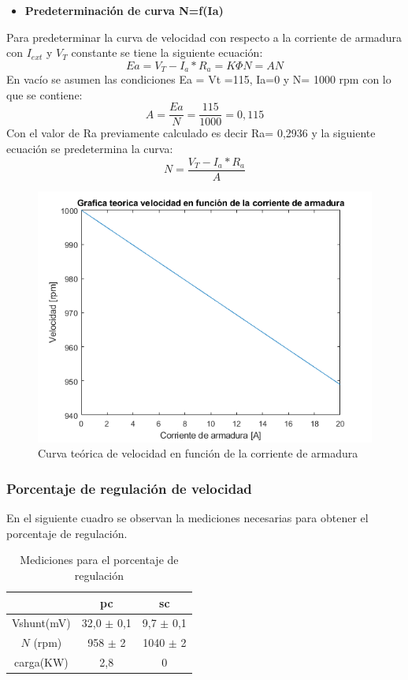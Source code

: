 \documentclass[11pt,letterpaper]{article}     %
\begin{document}
	\begin{itemize}
		\item \textbf{Predeterminación de curva N=f(Ia)}
	\end{itemize}
	Para predeterminar la curva de velocidad con respecto a la corriente de armadura con $I_{ext}$ y $V_{T}$ constante se tiene la siguiente ecuación:
	\begin{equation}
		Ea= V_T - I_a * R_a = K \Phi N = AN
	\end{equation}
	En vacío se asumen las condiciones Ea = Vt =115, Ia=0 y N= 1000 rpm con lo que se contiene:
	\begin{equation}
		A=\frac{Ea}{N}= \frac{115}{1000}=0,115
		\label{ecuacion A}
	\end{equation}
	Con el valor de Ra previamente calculado es decir Ra= 0,2936 y la siguiente ecuación se predetermina la curva:
	\begin{equation}
	N =\frac{V_T - I_a * R_a}{A}
		\label{ec.Velocidad corriente}
	\end{equation}
		\begin{figure}[H]
		\centering
		\includegraphics[scale=0.8]{./recursos-Lab6/curvaPredeterminarVelocidadCorrienteArmadura.png}
		\caption{Curva teórica de velocidad en función de la corriente de armadura}
		\label{fig:CurvaPredeterminarVelocidadCorrienteArmadura}
	\end{figure}
\subsubsection{Porcentaje de regulación de velocidad}
En el siguiente cuadro se observan la mediciones necesarias para obtener el porcentaje de regulación.
	\begin{table}[H]
		\centering
		\caption{Mediciones para el porcentaje de regulación}
		\label{Cuadro:Medicion porcentaje de regulacion}
		\begin{tabular}{|c|c|c|}
			\hline
			& pc & sc\\ \hline
			Vshunt(mV)& 32,0 $\pm$ 0,1 & 9,7 $\pm$ 0,1 \\ \hline
			$N$ (rpm)& 958 $\pm$ 2 &1040 $\pm$ 2 \\ \hline
			carga(KW)  & 2,8 &0\\ \hline
		\end{tabular}
	\end{table}
\end{document}
